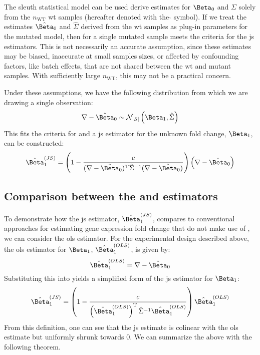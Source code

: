 The sleuth statistical model can be used derive estimates for $\Beta_0$ and $\Sigma$ solely from the $n_\mathrm{WT}$ \gls{wt} samples (hereafter denoted with the $\hat{}$ symbol).
If we treat the estimates $\hat{\Beta}_0$ and $\hat{\Sigma}$ derived from the \gls{wt} samples as plug-in parameters for the mutated model, then  for a single mutated sample meets the criteria for the \gls{js} estimators.
This is not necessarily an accurate assumption, since these estimates may be biased, inaccurate at small samples sizes, or affected by confounding factors, like batch effects, that are not shared between the \gls{wt} and mutant samples.
With sufficiently large $n_\mathrm{WT}$, this may not be a practical concern.

Under these assumptions, we have the following distribution from which we are drawing a single observation:
%
\begin{equation}
  \nabla - \hat{\Beta}_0 \sim \mathcal{N}_{|S|} \left( \Beta_1, \hat{\Sigma} \right)
  \label{eqn:delta_mut_js_dist}
\end{equation}
%
This fits the criteria for  and a \gls{js} estimator for the unknown fold change, $\Beta_1$, can be constructed:
%
\begin{equation}
  \fcjs = \left( 1 - \frac{c}{(\nabla - \hat{\Beta}_0)^\tran \hat{\Sigma}^{-1} (\nabla - \hat{\Beta}_0)} \right) \left(\nabla - \hat{\Beta}_0 \right)
  \label{eqn:js_defn}
\end{equation}

\subsection{Comparison between the  and  estimators}

To demonstrate how the \gls{js} estimator, $\fcjs$, compares to conventional approaches for estimating gene expression fold change that do not make use of , we can consider the \gls{ols} estimator.
For the experimental design described above, the \gls{ols} estimator for $\Beta_1$, $\fcols$, is given by:
%
\begin{equation}
  \fcols = \nabla - \hat{\Beta}_0
  \label{eqn:ols_defn}
\end{equation}
%
Substituting this into  yields a simplified form of the \gls{js} estimator for $\Beta_1$:
%
\begin{equation}
  \fcjs = \left( 1 - \frac{c}{\left( \fcols \right)^\tran \hat{\Sigma}^{-1} \fcols} \right) \fcols
  \label{eqn:js_defn_ols}
\end{equation}
%
From this definition, one can see that the \gls{js} estimate is colinear with the \gls{ols} estimate but uniformly shrunk towards 0.
We can summarize the above with the following theorem.

